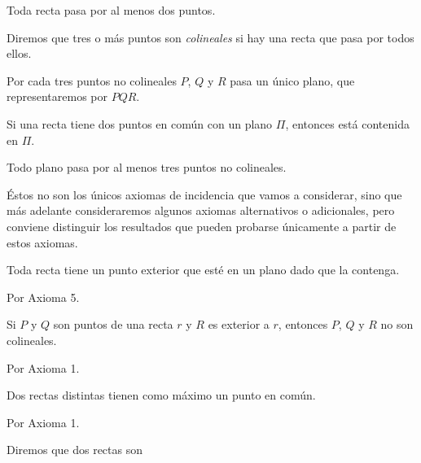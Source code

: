 \begin{axioma}
Toda recta pasa por al menos dos puntos.
\end{axioma}

Diremos que tres o más puntos son \emph{colineales} si hay una recta que
pasa por todos ellos.

\begin{axioma}
Por cada tres puntos no colineales $P$, $Q$ y $R$ pasa un único plano, que
representaremos por $PQR$.
\end{axioma}

\begin{axioma}
Si una recta tiene dos puntos en común con un plano $\Pi$, entonces está
contenida en $\Pi$.
\end{axioma}

\begin{axioma}
Todo plano pasa por al menos tres puntos no colineales.
\end{axioma}

Éstos no son los únicos axiomas de incidencia que vamos a considerar, sino
que más adelante consideraremos algunos axiomas alternativos o adicionales,
pero conviene distinguir los resultados que pueden probarse únicamente a
partir de estos axiomas.

\begin{teorema}
Toda recta tiene un punto exterior que esté en un plano dado que la contenga.
\end{teorema}
Por Axioma 5.
\begin{teorema}
Si $P$ y $Q$ son puntos de una recta $r$ y $R$ es exterior a $r$, entonces
$P$, $Q$ y $R$ no son colineales.
\end{teorema}
Por Axioma 1.
\begin{teorema}
Dos rectas distintas tienen como máximo un punto en común.
\end{teorema}
Por Axioma 1.

\begin{definicion}
Diremos que dos rectas son
\end{definicion}


